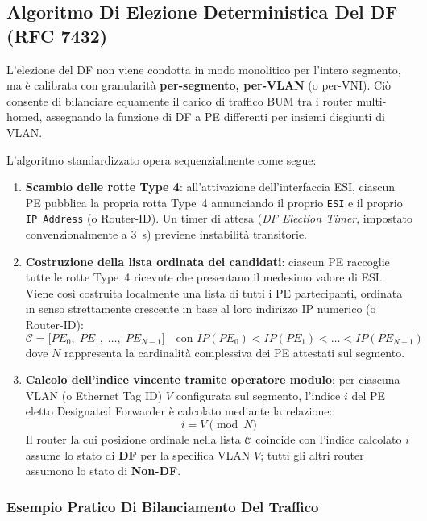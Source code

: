 \documentclass[11pt, a4paper]{article}
\begin{document}
\subsection{Algoritmo Di Elezione Deterministica Del DF (RFC 7432)}

L'elezione del DF non viene condotta in modo monolitico per l'intero segmento, ma è calibrata con granularità \textbf{per-segmento, per-VLAN} (o per-VNI). Ciò consente di bilanciare equamente il carico di traffico BUM tra i router multi-homed, assegnando la funzione di DF a PE differenti per insiemi disgiunti di VLAN.

L'algoritmo standardizzato opera sequenzialmente come segue:

\begin{enumerate}
    \item \textbf{Scambio delle rotte Type 4}: all'attivazione dell'interfaccia ESI, ciascun PE pubblica la propria rotta Type~4 annunciando il proprio \texttt{ESI} e il proprio \texttt{IP Address} (o Router-ID). Un timer di attesa (\emph{DF Election Timer}, impostato convenzionalmente a \SI{3}{\second}) previene instabilità transitorie.
    \item \textbf{Costruzione della lista ordinata dei candidati}: ciascun PE raccoglie tutte le rotte Type~4 ricevute che presentano il medesimo valore di ESI. Viene così costruita localmente una lista di tutti i PE partecipanti, ordinata in senso strettamente crescente in base al loro indirizzo IP numerico (o Router-ID):
    \[
    \mathcal{C} = \Big[ PE_0, \; PE_1, \; \dots, \; PE_{N-1} \Big] \quad \text{con } IP(PE_0) < IP(PE_1) < \dots < IP(PE_{N-1})
    \]
    dove $N$ rappresenta la cardinalità complessiva dei PE attestati sul segmento.
    \item \textbf{Calcolo dell'indice vincente tramite operatore modulo}: per ciascuna VLAN (o Ethernet Tag ID) $V$ configurata sul segmento, l'indice $i$ del PE eletto Designated Forwarder è calcolato mediante la relazione:
    \begin{equation}
        \boxed{i = V \pmod N}
    \end{equation}
    Il router la cui posizione ordinale nella lista $\mathcal{C}$ coincide con l'indice calcolato $i$ assume lo stato di \textbf{DF} per la specifica VLAN $V$; tutti gli altri router assumono lo stato di \textbf{Non-DF}.
\end{enumerate}

\subsubsection{Esempio Pratico Di Bilanciamento Del Traffico}
\end{document}
